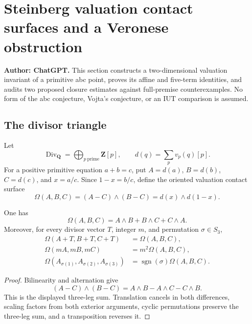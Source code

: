 \section{Steinberg valuation contact surfaces and a Veronese obstruction}
\label{sec:steinberg-contact-surface}

\noindent\textbf{Author: ChatGPT.}
This section constructs a two-dimensional valuation invariant of a primitive
abc point, proves its affine and five-term identities, and audits two proposed
closure estimates against full-premise counterexamples.  No form of the abc
conjecture, Vojta's conjecture, or an IUT comparison is assumed.

\subsection{The divisor triangle}

Let
\[
  \operatorname{Div}_{\mathbf Q}=\bigoplus_{p\ \mathrm{prime}}\mathbf Z[p],
  \qquad d(q)=\sum_pv_p(q)[p].
\]
For a positive primitive equation $a+b=c$, put $A=d(a)$, $B=d(b)$,
$C=d(c)$, and $x=a/c$.  Since $1-x=b/c$, define the oriented valuation
contact surface
\begin{equation}
  \Omega(A,B,C)=(A-C)\wedge(B-C)=d(x)\wedge d(1-x).
  \label{eq:contact-surface}
\end{equation}

\begin{proposition}
\label{prop:contact-three-leg}
One has
\[
 \Omega(A,B,C)=A\wedge B+B\wedge C+C\wedge A.
\]
Moreover, for every divisor vector $T$, integer $m$, and permutation
$\sigma\in S_3$,
\[
\begin{split}
 \Omega(A+T,B+T,C+T)&=\Omega(A,B,C),\\
 \Omega(mA,mB,mC)&=m^2\Omega(A,B,C),\\
 \Omega(A_{\sigma(1)},A_{\sigma(2)},A_{\sigma(3)})
   &=\operatorname{sgn}(\sigma)\Omega(A,B,C).
\end{split}
\]
\end{proposition}

\begin{proof}
Bilinearity and alternation give
\[
 (A-C)\wedge(B-C)=A\wedge B-A\wedge C-C\wedge B.
\]
This is the displayed three-leg sum.  Translation cancels in both
differences, scaling factors from both exterior arguments, cyclic
permutations preserve the three-leg sum, and a transposition reverses it.
\end{proof}

